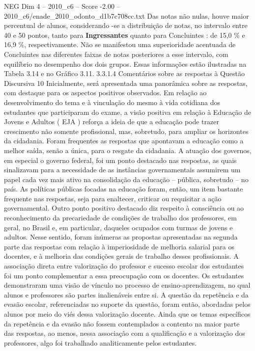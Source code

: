 \begin{textsample}{NEG Dim 4 – 2010\_c6 – Score -2.00 – 2010\_c6/enade\_2010\_odonto\_d1b7c708cc.txt}
Das notas não nulas, houve maior percentual de alunos, considerando -se a distribuição de notas, no intervalo entre 40 e 50 pontos, tanto para \textbf{Ingressantes} quanto para Concluintes : de 15,0 \% e 16,9 \%, respectivamente.
Não se manifestou uma superioridade acentuada de Concluintes nas diferentes faixas de notas posteriores a esse intervalo, com equilíbrio no desempenho dos dois grupos.
Essas informações estão ilustradas na Tabela 3.14 e no Gráfico 3.11. 3.3.1.4 Comentários sobre as respostas à Questão Discursiva 10 Inicialmente, será apresentada uma panorâmica sobre as respostas, com destaque para os aspectos positivos observados.
Em relação ao desenvolvimento do tema e à vinculação do mesmo à vida cotidiana dos estudantes que participaram do exame, a visão positiva em relação à Educação de Jovens e Adultos ( EJA ) reforça a ideia de que a educação pode trazer crescimento não somente profissional, mas, sobretudo, para ampliar os horizontes da cidadania.
Foram frequentes as respostas que apontavam a educação como a melhor saída, senão a única, para o resgate da cidadania.
A atuação dos governos, em especial o governo federal, foi um ponto destacado nas respostas, as quais sinalizavam para a necessidade de as instâncias governamentais assumirem um papel cada vez mais ativo na consolidação da educação – pública, sobretudo – no país.
As políticas públicas focadas na educação foram, então, um item bastante frequente nas respostas, seja para enaltecer, criticar ou requisitar a ação governamental.
Outro ponto positivo destacado diz respeito à consciência ou ao reconhecimento da precariedade de condições de trabalho dos professores, em geral, no Brasil e, em particular, daqueles ocupados com turmas de jovens e adultos.
Nesse sentido, foram inúmeras as propostas apresentadas na segunda parte das respostas com relação à imperiosidade de melhoria salarial para os docentes, e à melhoria das condições gerais de trabalho desses profissionais.
A associação direta entre valorização do professor e sucesso escolar dos estudantes foi um ponto complementar a essa preocupação com os docentes.
Os estudantes demonstraram uma visão de vínculo no processo de ensino-aprendizagem, no qual alunos e professores são partes inalienáveis entre si.
A questão da repetência e da evasão escolar, referenciadas no suporte da questão, foram então, abordadas pelos alunos por meio do viés dessa valorização docente.
Ainda que os temas específicos da repetência e da evasão não fossem contemplados a contento na maior parte das respostas, ao menos, nessa associação com a qualificação e a valorização dos professores, algo foi trabalhado analiticamente pelos estudantes.

\end{textsample}
